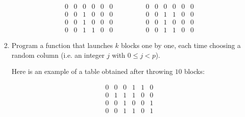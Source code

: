 \documentclass[11pt,class=report,crop=false]{standalone}
\begin{document}
\begin{activite}
\begin{enumerate}
$$\begin{array}{cccccc}
0&0&0&0&0&0\\
0&0&1&0&0&0\\
0&0&1&0&0&0\\
0&0&1&1&0&0
\end{array}\qquad\qquad
\begin{array}{cccccc}
0&0&0&0&0&0\\
0&0&1&1&0&0\\
0&0&1&0&0&0\\
0&0&1&1&0&0
\end{array}
$$
 

 
  \item Program a  function that launches 
  $k$ blocks one by one, each time choosing a random column (i.e. an integer $j$ with $0 \le j < p$). 
  
  Here is an example of a table obtained after throwing $10$ blocks:
  
 
\begin{center}
\begin{minipage}{0.3\textwidth} 
 $$\begin{array}{cccccc} 
0&0&0&1&1&0\\
0&1&1&1&0&0\\
0&0&1&0&0&1\\
0&0&1&1&0&1
\end{array}
$$
\end{minipage}
\begin{minipage}{0.4\textwidth} 
\end{minipage}
\end{center}  

\end{enumerate}

\end{activite}


\end{document}
